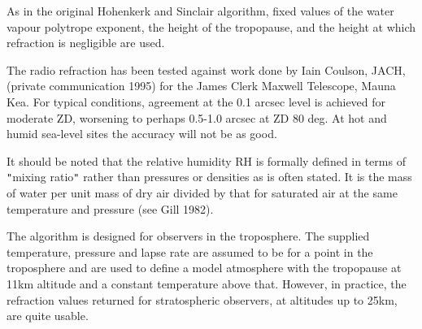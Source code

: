 \documentclass[twoside,11pt]{article}
\renewcommand{\_}{\texttt{\symbol{95}}}
\newcommand{\sstitem}{\item}
\newcommand{\sstitem}{\item}
\begin{document}
{{{         \sstitem
         As in the original Hohenkerk and Sinclair algorithm, fixed values
         of the water vapour polytrope exponent, the height of the
         tropopause, and the height at which refraction is negligible are
         used.

         \sstitem
         The radio refraction has been tested against work done by
         Iain Coulson, JACH, (private communication 1995) for the
         James Clerk Maxwell Telescope, Mauna Kea.  For typical conditions,
         agreement at the 0.1 arcsec level is achieved for moderate ZD,
         worsening to perhaps 0.5-1.0 arcsec at ZD 80 deg.  At hot and
         humid sea-level sites the accuracy will not be as good.

         \sstitem
         It should be noted that the relative humidity RH is formally
         defined in terms of {\tt "}mixing ratio{\tt "} rather than pressures or
         densities as is often stated.  It is the mass of water per unit
         mass of dry air divided by that for saturated air at the same
         temperature and pressure (see Gill 1982).

         \sstitem
         The algorithm is designed for observers in the troposphere. The
         supplied temperature, pressure and lapse rate are assumed to be
         for a point in the troposphere and are used to define a model
         atmosphere with the tropopause at 11km altitude and a constant
         temperature above that.  However, in practice, the refraction
         values returned for stratospheric observers, at altitudes up to
         25km, are quite usable.
      }
   }
}
\end{document}
